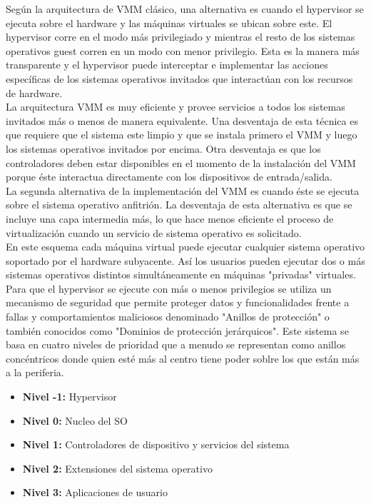 \documentclass[10pt,a4paper,spanish]{report}
\begin{document}
  \noindent
  Según la arquitectura de VMM clásico, una alternativa es cuando el hypervisor se ejecuta sobre el hardware y las máquinas virtuales se ubican sobre este. El hypervisor corre en el modo más privilegiado y mientras el resto de los sistemas operativos guest corren en un modo con menor privilegio. Esta es la manera más transparente y el hypervisor puede interceptar e implementar las acciones específicas de los sistemas operativos invitados que interactúan con los recursos de hardware. \\

  \noindent
  La arquitectura VMM es muy eficiente y provee servicios a todos los sistemas invitados más o menos de manera equivalente. Una desventaja de esta técnica es que requiere que el sistema este limpio y que se instala primero el VMM y luego los sistemas operativos invitados por encima. Otra desventaja es que los controladores deben estar disponibles en el momento de la instalación del VMM porque éste interactua directamente con los dispositivos de entrada/salida. \\

  \newpage
  \noindent
  La segunda alternativa de la implementación del VMM es cuando éste se ejecuta sobre el sistema operativo anfitrión. La desventaja de esta alternativa es que se incluye una capa intermedia más, lo que hace menos eficiente el proceso de virtualización cuando un servicio de sistema operativo es solicitado. \\

  \noindent
  En este esquema cada máquina virtual puede ejecutar cualquier sistema operativo soportado por el hardware subyacente. Así los usuarios pueden ejecutar dos o más sistemas operativos distintos simultáneamente en máquinas "privadas" virtuales.\\

  \noindent
  Para que el hypervisor se ejecute con más o menos privilegios se utiliza un mecanismo de seguridad que permite proteger datos y funcionalidades frente a fallas y comportamientos maliciosos denominado "Anillos de protección" o también conocidos como "Dominios de protección jerárquicos". Este sistema se basa en cuatro niveles de prioridad que a menudo se representan como anillos concéntricos donde quien esté más al centro tiene poder soblre los que están más a la periferia.

  \begin{itemize}
    \item \textbf{Nivel -1: } Hypervisor
    \item \textbf{Nivel 0: } Nucleo del SO
    \item \textbf{Nivel 1: } Controladores de dispositivo y servicios del sistema
    \item \textbf{Nivel 2: } Extensiones del sistema operativo
    \item \textbf{Nivel 3: } Aplicaciones de usuario
  \end{itemize}
\end{document}
